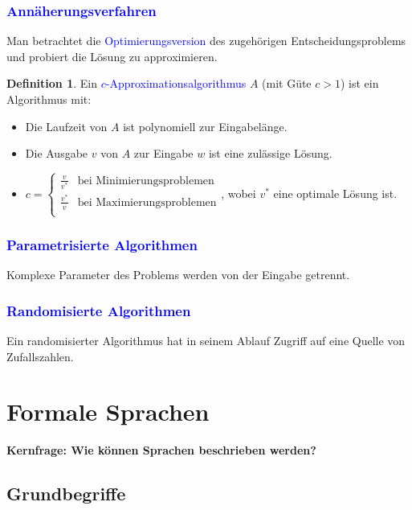 \documentclass{scrreprt}
\theoremstyle{definition}
\newtheorem{Definition}{Definition}[section]
\theoremstyle{example}
\theoremstyle{algorithm}
\begin{document}
\subsection{\textcolor{blue}{Annäherungsverfahren}}
Man betrachtet die \textcolor{blue}{Optimierungsversion} des zugehörigen Entscheidungsproblems und probiert die Lösung zu approximieren.
\begin{Definition}
Ein \textcolor{blue}{$c$-Approximationsalgorithmus} $A$ (mit Güte $c > 1$) ist ein Algorithmus mit:
\begin{itemize}
\item
Die Laufzeit von $A$ ist polynomiell zur Eingabelänge.
\item
Die Ausgabe $v$ von $A$ zur Eingabe $w$ ist eine zulässige Lösung.
\item
$c=
\begin{cases}
\frac{v}{v^*}& \text{bei Minimierungsproblemen}\\
\frac{v^*}{v}& \text{bei Maximierungsproblemen}\\
\end{cases}$, wobei $v^*$ eine optimale Lösung ist.
\end{itemize}
\end{Definition}
\subsection{\textcolor{blue}{Parametrisierte Algorithmen}}
Komplexe Parameter des Problems werden von der Eingabe getrennt.

\subsection{\textcolor{blue}{Randomisierte Algorithmen}}
Ein randomisierter Algorithmus hat in seinem Ablauf Zugriff auf eine Quelle von Zufallszahlen.

\chapter{Formale Sprachen}
\textbf{Kernfrage: Wie können Sprachen beschrieben werden?}

\section{Grundbegriffe}
\end{document}
